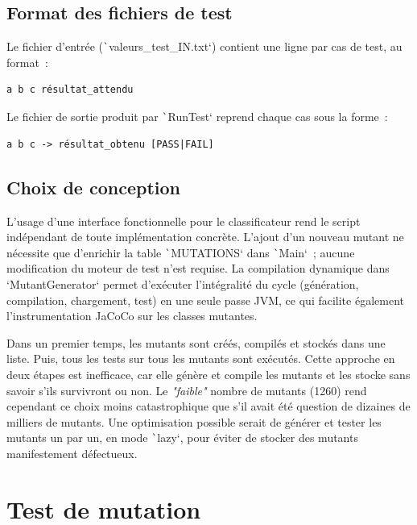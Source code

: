 \documentclass[a4paper,11pt]{article}
\begin{document}
\subsection{Format des fichiers de test}

Le fichier d'entrée (\texttt`valeurs_test_IN.txt`) contient une ligne par cas de test, au format~:

\begin{verbatim}
a b c résultat_attendu
\end{verbatim}

Le fichier de sortie produit par \texttt`RunTest` reprend chaque cas sous la forme~:

\begin{verbatim}
a b c -> résultat_obtenu [PASS|FAIL]
\end{verbatim}

\subsection{Choix de conception}

\label{choice}

L'usage d'une interface fonctionnelle pour le classificateur rend le script indépendant de toute implémentation concrète. L'ajout d'un nouveau mutant ne nécessite que d'enrichir la table \texttt`MUTATIONS` dans \texttt`Main`~; aucune modification du moteur de test n'est requise. La compilation dynamique dans `MutantGenerator` permet d'exécuter l'intégralité du cycle (génération, compilation, chargement, test) en une seule passe JVM, ce qui facilite également l'instrumentation JaCoCo sur les classes mutantes.

Dans un premier temps, les mutants sont créés, compilés et stockés dans une liste. Puis, tous les tests sur tous les mutants sont exécutés. Cette approche en deux étapes est inefficace, car elle génère et compile les mutants et les stocke sans savoir s'ils survivront ou non. Le \textit{"faible"} nombre de mutants (1260) rend cependant ce choix moins catastrophique que s'il avait été question de dizaines de milliers de mutants. Une optimisation possible serait de générer et tester les mutants un par un, en mode \texttt`lazy`, pour éviter de stocker des mutants manifestement défectueux.

\section{Test de mutation}
\end{document}
